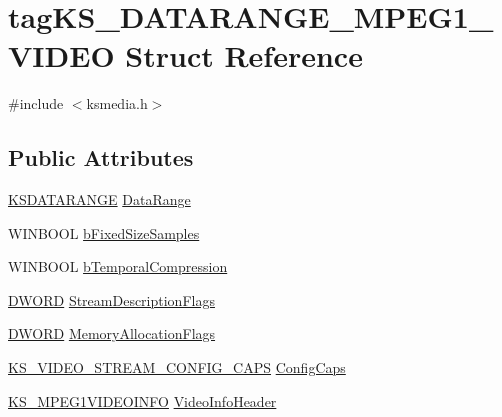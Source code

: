 \hypertarget{structtag_k_s___d_a_t_a_r_a_n_g_e___m_p_e_g1___v_i_d_e_o}{}\section{tag\+K\+S\+\_\+\+D\+A\+T\+A\+R\+A\+N\+G\+E\+\_\+\+M\+P\+E\+G1\+\_\+\+V\+I\+D\+EO Struct Reference}
\label{structtag_k_s___d_a_t_a_r_a_n_g_e___m_p_e_g1___v_i_d_e_o}


{\ttfamily \#include $<$ksmedia.\+h$>$}

\subsection*{Public Attributes}
\begin{DoxyCompactItemize}
\item 
\hyperlink{ks_8h_a1ea8bc535eaf96036403dc325623b469}{K\+S\+D\+A\+T\+A\+R\+A\+N\+GE} \hyperlink{structtag_k_s___d_a_t_a_r_a_n_g_e___m_p_e_g1___v_i_d_e_o_a1c4fe88e1c420f2d0202221f0665abbd}{Data\+Range}
\item 
W\+I\+N\+B\+O\+OL \hyperlink{structtag_k_s___d_a_t_a_r_a_n_g_e___m_p_e_g1___v_i_d_e_o_a19635b122951e759b8531dcd3bb190a8}{b\+Fixed\+Size\+Samples}
\item 
W\+I\+N\+B\+O\+OL \hyperlink{structtag_k_s___d_a_t_a_r_a_n_g_e___m_p_e_g1___v_i_d_e_o_acba9dd5431b91414c56e271486865db6}{b\+Temporal\+Compression}
\item 
\hyperlink{mapinls_8h_ad342ac907eb044443153a22f964bf0af}{D\+W\+O\+RD} \hyperlink{structtag_k_s___d_a_t_a_r_a_n_g_e___m_p_e_g1___v_i_d_e_o_a0543d9eefe5dab635069d7a5602e3b7b}{Stream\+Description\+Flags}
\item 
\hyperlink{mapinls_8h_ad342ac907eb044443153a22f964bf0af}{D\+W\+O\+RD} \hyperlink{structtag_k_s___d_a_t_a_r_a_n_g_e___m_p_e_g1___v_i_d_e_o_a05322894ec42e7dee8d1f98e6730a777}{Memory\+Allocation\+Flags}
\item 
\hyperlink{ksmedia_8h_a6206e1a832fffa713842974c34128ade}{K\+S\+\_\+\+V\+I\+D\+E\+O\+\_\+\+S\+T\+R\+E\+A\+M\+\_\+\+C\+O\+N\+F\+I\+G\+\_\+\+C\+A\+PS} \hyperlink{structtag_k_s___d_a_t_a_r_a_n_g_e___m_p_e_g1___v_i_d_e_o_a40b48669a31a9af658c7086d1becf6ec}{Config\+Caps}
\item 
\hyperlink{ksmedia_8h_a19020086e90c5a86ce79a3e2cb151091}{K\+S\+\_\+\+M\+P\+E\+G1\+V\+I\+D\+E\+O\+I\+N\+FO} \hyperlink{structtag_k_s___d_a_t_a_r_a_n_g_e___m_p_e_g1___v_i_d_e_o_a5714b9d17304d373cbab0d2c63620acf}{Video\+Info\+Header}
\end{DoxyCompactItemize}


